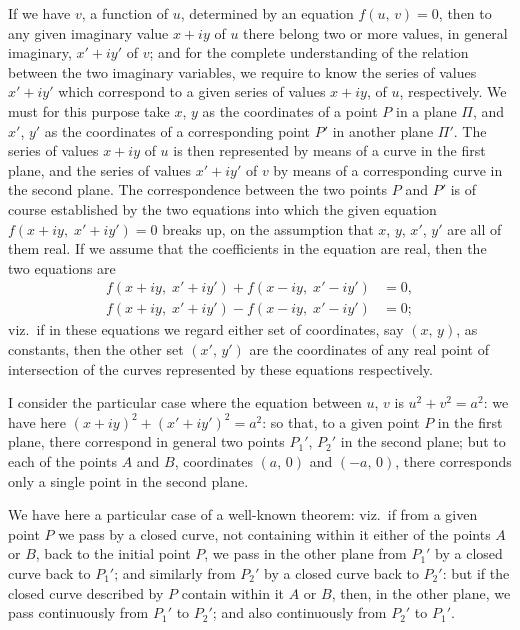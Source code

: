 \documentclass[12pt,a4paper]{article}
\begin{document}
\medskip
\noindent
If we have $v$, a function of $u$, determined by an equation $f(u,\,v) = 0$, then to any given imaginary value $x+iy$ of $u$ there belong two or more values, in general imaginary, $x'+iy'$ of $v$; and for the complete understanding of the relation between the two imaginary variables, we require to know the series of values $x'+iy'$ which correspond to a given series of values $x+iy$, of $u$, respectively. We must for this purpose take $x$, $y$ as the coordinates of a point $P$ in a plane $\Pi$, and $x'$, $y'$ as the coordinates of a corresponding point $P'$ in another plane $\Pi'$. The series of values $x+iy$ of $u$ is then represented by means of a curve in the first plane, and the series of values $x'+iy'$ of $v$ by means of a corresponding curve in the second plane. The correspondence between the two points $P$ and $P'$ is of course established by the two equations into which the given equation $f(x+iy,\; x'+iy') = 0$ breaks up, on the assumption that $x$, $y$, $x'$, $y'$ are all of them real. If we assume that the coefficients in the equation are real, then the two equations are
\begin{align*}
f(x+iy,\; x'+iy') + f(x-iy,\; x'-iy') &= 0, \\
f(x+iy,\; x'+iy') - f(x-iy,\; x'-iy') &= 0;
\end{align*}
viz.\ if in these equations we regard either set of coordinates, say $(x,\,y)$, as constants, then the other set $(x',\,y')$ are the coordinates of any real point of intersection of the curves represented by these equations respectively.

I consider the particular case where the equation between $u$, $v$ is $u^2 + v^2 = a^2$: we have here $(x+iy)^2 + (x'+iy')^2 = a^2$: so that, to a given point $P$ in the first plane, there correspond in general two points $P_1'$, $P_2'$ in the second plane; but to each of the points $A$ and $B$, coordinates $(a,\,0)$ and $(-a,\,0)$, there corresponds only a single point in the second plane.

We have here a particular case of a well-known theorem: viz.\ if from a given point $P$ we pass by a closed curve, not containing within it either of the points $A$ or $B$, back to the initial point $P$, we pass in the other plane from $P_1'$ by a closed curve back to $P_1'$; and similarly from $P_2'$ by a closed curve back to $P_2'$: but if the closed curve described by $P$ contain within it $A$ or $B$, then, in the other plane, we pass continuously from $P_1'$ to $P_2'$; and also continuously from $P_2'$ to $P_1'$.
\end{document}

